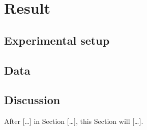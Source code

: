 \newpage
\section{Result}
\label{sec:Result}
\subsection{Experimental setup}
\subsection{Data}
\subsection{Discussion}

After [\dots] in Section [\dots], this Section will [\dots].

